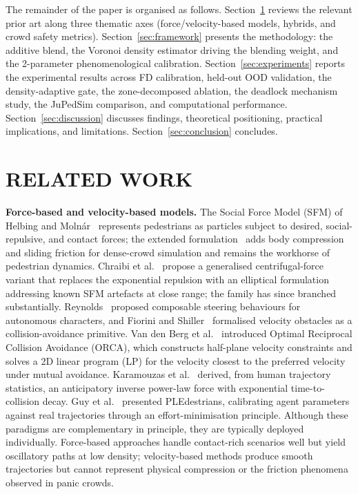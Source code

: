 \documentclass[a4paper,twoside]{article}
\begin{document}
The remainder of the paper is organised as follows. Section~\ref{sec:related} reviews the relevant prior art along three thematic axes (force/velocity-based models, hybrids, and crowd safety metrics). Section~\ref{sec:framework} presents the methodology: the additive blend, the Voronoi density estimator driving the blending weight, and the 2-parameter phenomenological calibration. Section~\ref{sec:experiments} reports the experimental results across FD calibration, held-out OOD validation, the density-adaptive gate, the zone-decomposed ablation, the deadlock mechanism study, the JuPedSim comparison, and computational performance. Section~\ref{sec:discussion} discusses findings, theoretical positioning, practical implications, and limitations. Section~\ref{sec:conclusion} concludes.


\section{\uppercase{Related Work}}
\label{sec:related}

\textbf{Force-based and velocity-based models.}
The Social Force Model (SFM) of Helbing and Moln\'{a}r~\cite{Helbing95} represents pedestrians as particles subject to desired, social-repulsive, and contact forces; the extended formulation~\cite{Helbing00} adds body compression and sliding friction for dense-crowd simulation and remains the workhorse of pedestrian dynamics. Chraibi et al.~\cite{Chraibi10} propose a generalised centrifugal-force variant that replaces the exponential repulsion with an elliptical formulation addressing known SFM artefacts at close range; the family has since branched substantially. Reynolds~\cite{Reynolds99} proposed composable steering behaviours for autonomous characters, and Fiorini and Shiller~\cite{Fiorini98} formalised velocity obstacles as a collision-avoidance primitive. Van den Berg et al.~\cite{VandenBerg11} introduced Optimal Reciprocal Collision Avoidance (ORCA), which constructs half-plane velocity constraints and solves a 2D linear program (LP) for the velocity closest to the preferred velocity under mutual avoidance. Karamouzas et al.~\cite{Karamouzas14} derived, from human trajectory statistics, an anticipatory inverse power-law force with exponential time-to-collision decay. Guy et al.~\cite{Guy10} presented PLEdestrians, calibrating agent parameters against real trajectories through an effort-minimisation principle. Although these paradigms are complementary in principle, they are typically deployed individually. Force-based approaches handle contact-rich scenarios well but yield oscillatory paths at low density; velocity-based methods produce smooth trajectories but cannot represent physical compression or the friction phenomena observed in panic crowds.
\end{document}
